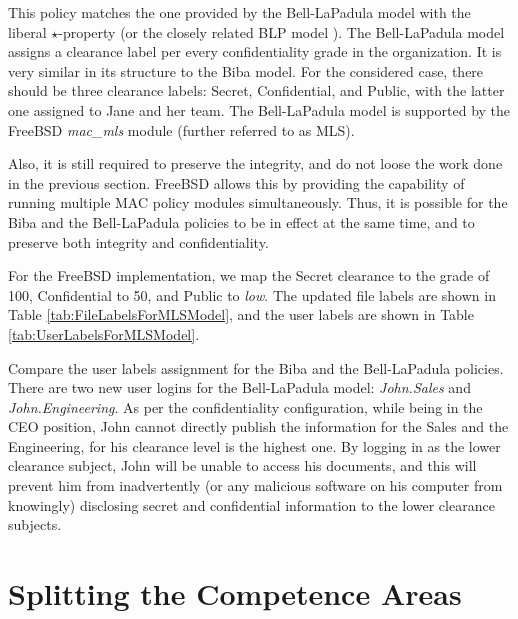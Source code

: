 \documentclass[10pt,a4paper,conference,onecolumn]{IEEEtran}
\newcommand{\KBERcode}[1]{\textsl{#1}}
\begin{document}
This policy matches the one provided by the Bell-LaPadula model with 
the liberal $\star$-property \cite{DBLP:journals/jcs/BellL96} (or the closely related BLP 
model \cite{DBLP:journals/computer/Sandhu93}). The Bell-LaPadula model assigns a clearance
label per every confidentiality grade in the organization. It is very
similar in its structure to the Biba model. For the considered case, there 
should be three clearance labels: Secret, Confidential, and
Public, with the latter one assigned to Jane and her team. The Bell-LaPadula
model is supported by the FreeBSD \KBERcode{mac\_mls} module (further referred to as MLS).

Also, it is still required to preserve the integrity, and do not loose
the work done in the previous section. FreeBSD allows this by providing
the capability of running multiple MAC policy modules simultaneously.
Thus, it is possible for the Biba and the Bell-LaPadula policies to
be in effect at the same time, and to preserve both integrity and
confidentiality.

For the FreeBSD implementation, we map the Secret clearance to the grade of
100, Confidential to 50, and Public to \KBERcode{low}. The updated file
labels are shown in Table \ref{tab:FileLabelsForMLSModel}, and the
user labels are shown in Table \ref{tab:UserLabelsForMLSModel}.

Compare the user labels assignment for the Biba and the Bell-LaPadula
policies. There are two new user logins for the Bell-LaPadula
model: \KBERcode{John.Sales} and \KBERcode{John.Engineering}.
As per the confidentiality configuration, while being in the CEO
position, John cannot directly publish the information for the Sales and
the Engineering, for his clearance level is the highest one.
By logging in as the lower clearance subject, John will be unable to access
his documents, and this will prevent him from inadvertently (or any malicious 
software on his computer from knowingly) disclosing secret and confidential
information to the lower clearance subjects.


\section{Splitting the Competence Areas}
\end{document}
